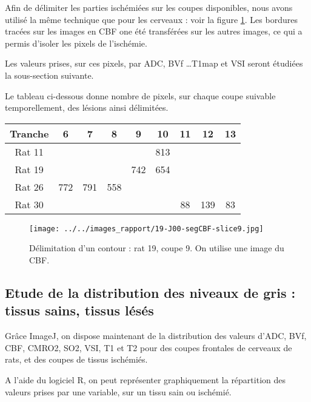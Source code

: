 \etoile
Afin de d\'elimiter les parties isch\'emi\'ees sur les coupes disponibles, nous avons utilis\'e la m\^eme technique que pour les cerveaux : voir la figure \ref{cbf_seg_19}. %
Les bordures trac\'ees sur les images en CBF one \'et\'e transf\'er\'ees sur les autres images, ce qui a permis d'isoler les pixels de l'isch\'emie.

\par
Les valeurs prises, sur ces pixels, par ADC, BVf \dots T1map et VSI seront \'etudi\'ees  la sous-section suivante.

\par
Le tableau ci-dessous donne nombre de pixels, sur chaque coupe suivable temporellement, des l\'esions ainsi d\'elimit\'ees.

\begin{multicols}{2}
\begin{tabular}{|c|c|c|c|c|c|c|c|c|}
\hline
\small{Tranche}&6&7&8&9&10&11&12&13
\\
\hline
Rat 11&&&&&813&&&
\\
\hline
Rat 19&&&&742&654&&&
\\
\hline
Rat 26&772&791&558&&&&&
\\
\hline
Rat 30&&&&&&88&139&83
\\
\hline
\end{tabular}

\columnbreak
\begin{figure}[H]
\begin{center}
\texttt{[image: ../../images\_rapport/19-J00-segCBF-slice9.jpg]}
\end{center}
\caption{D\'elimitation d'un contour : rat 19, coupe 9. On utilise une image du CBF.}
\label{cbf_seg_19}
\end{figure}
\end{multicols}

\newpage
\FloatBarrier
\subsection{Etude de la distribution des niveaux de gris : tissus sains, tissus l\'es\'es}%

Gr\^ace  ImageJ, on dispose maintenant de la distribution des valeurs d'ADC, BVf, CBF, CMRO2, SO2, VSI, T1 et T2 pour des coupes frontales de cerveaux de rats, %
et des coupes de tissus isch\'emi\'es.

\par
A l'aide du logiciel R, on peut repr\'esenter graphiquement la r\'epartition des valeurs prises par une variable, %
sur un tissu sain ou isch\'emi\'e.

